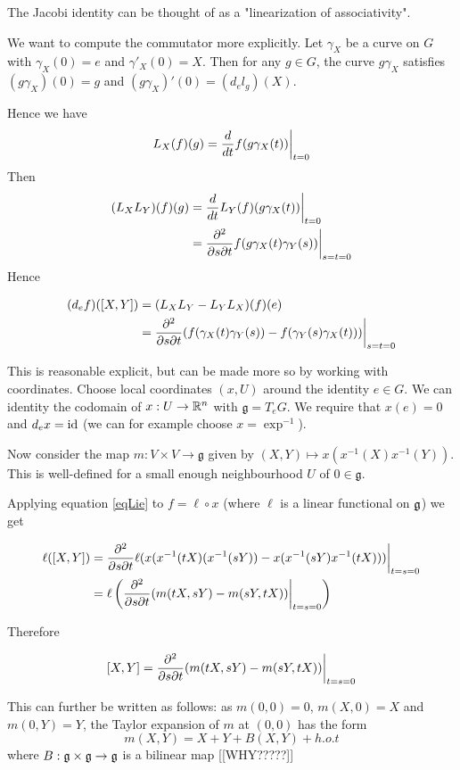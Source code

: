 \documentclass[11pt, english]{article}
\begin{document}
The Jacobi identity can be thought of as a "linearization of associativity". 

We want to compute the commutator more explicitly. Let $\gamma_X$ be a curve on $G$ with $\gamma_X(0)=e$ and $\gamma'_X(0)=X$. Then for any $g \in G$, the curve $g \gamma_X$ satisfies $(g \gamma_X)(0)=g$ and $(g \gamma_X)'(0) = (d_e l_g)(X)$. 

Hence we have 
$$
L_X(f)(g) =\restr{ \frac{d}{dt} f(g \gamma_X(t))}{t=0}
$$
Then
\begin{align*}
(L_XL_Y)(f)(g) &= \restr{\frac{d}{dt} L_Y(f) (g \gamma_X(t))}{t=0} \\
&= \restr{\frac{\partial^2}{\partial s \partial t} f(g \gamma_X(t) \gamma_Y(s))}{s=t=0}
\end{align*}
Hence

\begin{align}
(d_ef)([X,Y]) &= (L_X L_Y - L_Y L_X)(f)(e) \nonumber \\
&= \restr{
\frac{\partial^2}{\partial s \partial t} (f(\gamma_X(t)\gamma_Y(s))-f(\gamma_Y(s)\gamma_X(t)))}{s=t=0} \label{eqLie}
\end{align}

This is reasonable explicit, but can be made more so by working with coordinates. Choose local coordinates $(x,U)$ around the identity $e \in G$. We can identity the codomain of $x:U \to \mathbb{R}^n$ with $\mathfrak g=T_eG$. We require that $x(e)=0$ and $d_ex = \text{id}$ (we can for example choose $x = \exp^{-1}$). 

Now consider the map $m:V \times V \to \mathfrak g$ given by $(X,Y) \mapsto x(x^{-1}(X)x^{-1}(Y))$. This is well-defined for a small enough neighbourhood $U$ of $0 \in \mathfrak g$. 

Applying equation \eqref{eqLie} to $f = \ell \circ x$ (where $\ell$ is a linear functional on $\mathfrak g$) we get 

\begin{align*}
\ell([X,Y]) &= \restr{\frac{\partial^2}{\partial s \partial t} \ell(x(x^{-1}(tX)(x^{-1}(sY))-x(x^{-1}(sY)x^{-1}(tX)))}{t=s=0} \\
&= \ell \left(\restr{\frac{\partial^2}{\partial s \partial t} (m(tX,sY) - m(sY,tX))}{t=s=0} \right)
\end{align*}

Therefore 

$$
[X,Y] = \restr{\frac{\partial^2}{\partial s \partial t} (m(tX,sY) - m(sY,tX))}{t=s=0} 
$$

This can further be written as follows: as $m(0,0)=0$, $m(X,0)=X$ and $m(0,Y)=Y$, the Taylor expansion of $m$ at $(0,0)$ has the form
$$
m(X,Y) = X+Y + B(X,Y) + h.o.t
$$
where $B: \mathfrak g \times \mathfrak g \to \mathfrak g$ is a bilinear map [[WHY?????]] 
\end{document}

